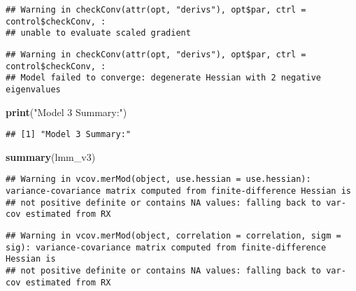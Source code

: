 \documentclass[
]{article}
\newenvironment{Shaded}{\begin{snugshade}}{\end{snugshade}}
\newcommand{\FunctionTok}[1]{\textcolor[rgb]{0.13,0.29,0.53}{\textbf{#1}}}
\newcommand{\NormalTok}[1]{#1}
\newcommand{\StringTok}[1]{\textcolor[rgb]{0.31,0.60,0.02}{#1}}
\begin{document}
\begin{verbatim}
## Warning in checkConv(attr(opt, "derivs"), opt$par, ctrl = control$checkConv, :
## unable to evaluate scaled gradient
\end{verbatim}

\begin{verbatim}
## Warning in checkConv(attr(opt, "derivs"), opt$par, ctrl = control$checkConv, :
## Model failed to converge: degenerate Hessian with 2 negative eigenvalues
\end{verbatim}

\begin{Shaded}
\begin{Highlighting}[]
\FunctionTok{print}\NormalTok{(}\StringTok{"Model 3 Summary:"}\NormalTok{)}
\end{Highlighting}
\end{Shaded}

\begin{verbatim}
## [1] "Model 3 Summary:"
\end{verbatim}

\begin{Shaded}
\begin{Highlighting}[]
\FunctionTok{summary}\NormalTok{(lmm\_v3)}
\end{Highlighting}
\end{Shaded}

\begin{verbatim}
## Warning in vcov.merMod(object, use.hessian = use.hessian): variance-covariance matrix computed from finite-difference Hessian is
## not positive definite or contains NA values: falling back to var-cov estimated from RX
\end{verbatim}

\begin{verbatim}
## Warning in vcov.merMod(object, correlation = correlation, sigm = sig): variance-covariance matrix computed from finite-difference Hessian is
## not positive definite or contains NA values: falling back to var-cov estimated from RX
\end{verbatim}
\end{document}
